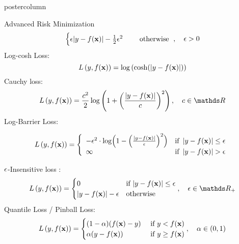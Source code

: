 \documentclass{beamer}
\begin{document}
\begin{frame}[fragile]{}
\begin{columns}
\begin{column}{.31\textwidth}
\begin{beamercolorbox}[center]{postercolumn}
\begin{minipage}{.98\textwidth}
{\begin{myblock}{Advanced Risk Minimization}
$$\begin{cases}
												\epsilon |y - f(\mathbf{x})|-\frac{1}{2}\epsilon^2 \quad & \text{ otherwise }
											\end{cases}
									, \quad \epsilon > 0
								$$
								Log-cosh Loss:
								$$
									L\left(y, f(\mathbf{x})\right) = \log \left( \cosh(\left|y - f(\mathbf{x})\right|) \right)
								$$
								Cauchy loss:
								$$
									\Lxy = \frac{c^2}{2} \log \left( 1 + \left( \frac{\left|y - \fx\right|}{c}\right)^2 \right), 
									\quad c \in \R
								$$
								Log-Barrier Loss:
								\begin{small}
									\[
									L\left(y, f(\mathbf{x})\right) = \left\{\begin{array}{lr}
										-\epsilon^{2} \cdot \log \Bigl( 1 - \Bigl(\frac{\left|y - f(\mathbf{x})\right|}{\epsilon}\Bigr)^2 \Bigr) & \text{if } \left|y-f(\mathbf{x})\right| \leq \epsilon \\
										\infty & \text{if } \left|y-f(\mathbf{x})\right|  > \epsilon
												\end{array}
											\right.
									\]
								\end{small}
								$\epsilon$-Insensitive loss :
								$$
									\Lxy =  \begin{cases}
												0  & \text{if } |y - \fx| \le \epsilon \\
												|y - \fx|-\epsilon & \text{otherwise }
											\end{cases},
									\quad \epsilon \in \R_{+}
								$$
								Quantile Loss / Pinball Loss:
								$$
									L\left(y, f(\mathbf{x})\right) = \begin{cases}
												(1 - \alpha) (f(\mathbf{x}) - y) & \text{ if } y < f(\mathbf{x})\\
												\alpha (y - f(\mathbf{x})) & \text{ if } y \ge f(\mathbf{x})
											\end{cases},
									\quad \alpha \in (0, 1)
								$$
\end{myblock}}
\end{minipage}
\end{beamercolorbox}
\end{column}
\end{columns}
\end{frame}
\end{document}
